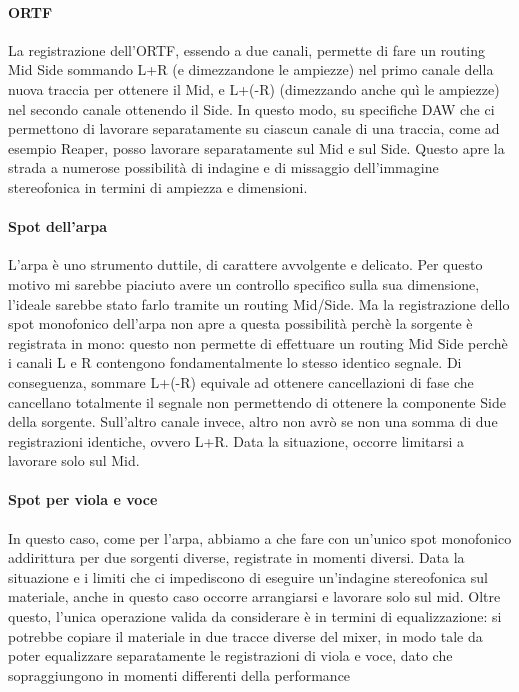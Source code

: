 		\paragraph{ORTF} La registrazione dell'ORTF, essendo a due canali, permette di fare un routing Mid Side sommando L+R (e dimezzandone le ampiezze) nel primo canale della nuova traccia per ottenere il Mid, e L+(-R) (dimezzando anche quì le ampiezze) nel secondo canale ottenendo il Side.
		In questo modo, su specifiche DAW che ci permettono di lavorare separatamente su ciascun canale di una traccia, come ad esempio Reaper, posso lavorare separatamente sul Mid e sul Side. Questo apre la strada a numerose possibilità di indagine e di missaggio dell'immagine stereofonica in termini di ampiezza e dimensioni.
		
		\paragraph{Spot dell'arpa} L'arpa è uno strumento duttile, di carattere avvolgente e delicato. Per questo motivo mi sarebbe piaciuto avere un controllo specifico sulla sua dimensione, l'ideale sarebbe stato farlo tramite un routing  Mid/Side. Ma la registrazione dello spot monofonico dell'arpa non apre a questa possibilità perchè la sorgente è registrata in mono: questo non permette di effettuare un routing Mid Side perchè i canali L e R contengono fondamentalmente lo stesso identico segnale. Di conseguenza, sommare L+(-R) equivale ad ottenere cancellazioni di fase che cancellano totalmente il segnale non permettendo di ottenere la componente Side della sorgente. Sull'altro canale invece, altro non avrò se non una somma di due registrazioni identiche, ovvero L+R. Data la situazione, occorre limitarsi a lavorare solo sul Mid.
		
		\paragraph{Spot per viola e voce} In questo caso, come per l'arpa, abbiamo a che fare con un'unico spot monofonico addirittura per due sorgenti diverse, registrate in momenti diversi.
		Data la situazione e i limiti che ci impediscono di eseguire un'indagine stereofonica sul materiale, anche in questo caso occorre arrangiarsi e lavorare solo sul mid.
		Oltre questo, l'unica operazione valida da considerare è in termini di equalizzazione: si potrebbe copiare il materiale in due tracce diverse del mixer, in modo tale da poter equalizzare separatamente le registrazioni di viola e voce, dato che sopraggiungono in momenti differenti della performance
	
